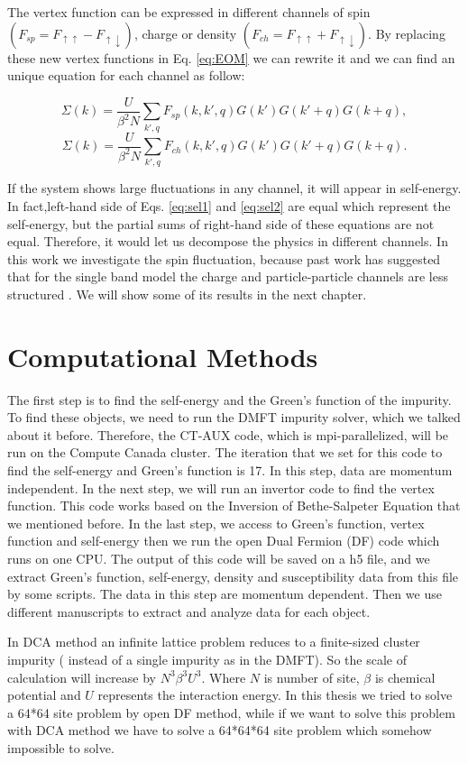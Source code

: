The vertex function can be expressed in different channels of spin $(F_{sp}=F_{\uparrow\uparrow}-F_{\uparrow\downarrow})$, charge or density $(F_{ch}=F_{\uparrow\uparrow}+F_{\uparrow\downarrow})$. By replacing these new vertex functions in Eq. \ref{eq:EOM} we can rewrite it and we can find an unique equation for each channel as follow:

\begin{equation}
     \Sigma(k)= \frac{U}{\beta^2N}\sum_{k',q}F_{sp}(k,k',q)G(k')G(k'+q)G(k+q),
     \label{eq:sel1}
\end{equation}
\begin{equation}
     \Sigma(k)= \frac{U}{\beta^2N}\sum_{k',q}F_{ch}(k,k',q)G(k')G(k'+q)G(k+q).
     \label{eq:sel2}
\end{equation}

If the system shows large fluctuations in any channel,
it will appear in self-energy. In fact,left-hand side of Eqs. \ref{eq:sel1} and \ref{eq:sel2} are equal which represent the self-energy, but the partial sums of right-hand side of these equations are not equal. Therefore, it would let us decompose the physics in different channels. In this work we investigate the spin fluctuation, because past work has suggested that for the single band model the charge and particle-particle channels are less structured \cite{Toschi}. We will show some of its results in the next chapter.

\section{Computational Methods}
The first step is to find the self-energy and the Green's function of the impurity. To find these objects, we need to run the DMFT impurity solver, which we talked about it before. Therefore, the CT-AUX code, which is mpi-parallelized, will be run on the Compute Canada cluster.  The iteration that we set for this code to find the self-energy and Green's function is 17. In this step, data are momentum independent. In the next step, we will run an invertor code to find the vertex function. This code works based on the Inversion of Bethe-Salpeter Equation that we mentioned before. In the last step, we access to Green's function, vertex function and self-energy then we run the open Dual Fermion (DF) code which runs on one CPU. The output of this code will be saved on a h5 file, and we extract Green's function, self-energy, density and susceptibility data from this file by some scripts. The data in this step are momentum dependent. Then we use different manuscripts to extract and analyze data for each object.

In DCA method an infinite lattice problem reduces to a finite-sized cluster impurity ( instead of a single impurity as in the DMFT). So the scale of calculation will increase by $N^3 \beta ^3 U^3$. Where $N$ is number of site, $\beta$ is chemical potential and $U$ represents the interaction energy. In this thesis we tried to solve a 64*64 site problem by open DF method, while if we want to solve this problem with DCA method we have to solve a 64*64*64 site problem which somehow impossible to solve. 


